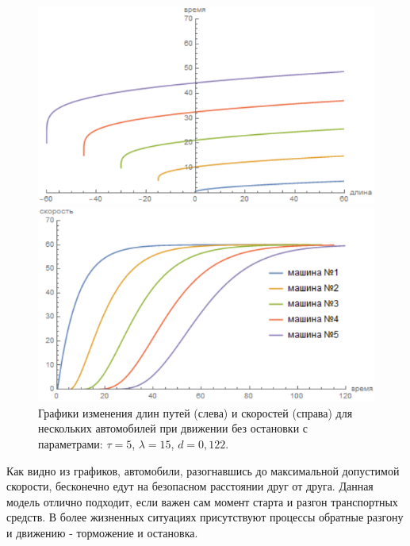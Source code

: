 \documentclass[12pt, a4paper]{extarticle}
\numberwithin{equation}{section}
\begin{document}
\begin{figure}[h!]
	\begin{center}
		\begin{minipage}[h!]{0.48\linewidth}
			\includegraphics[width=1\linewidth,height=0.2\textheight]
			{Images/distance_without_stop_d=0,122_tau=5.png}
		\end{minipage}
		\hfill 
		\begin{minipage}[h!]{0.48\linewidth}
			\includegraphics[width=1\linewidth,height=0.2\textheight]
			{Images/speed_without_stop_d=0,122_tau=5.png}
		\end{minipage}	
		\caption{Графики изменения длин путей (слева) и скоростей (справа) для нескольких автомобилей при движении без остановки с параметрами: $\tau=5$, $\lambda=15$, $d=0,122$.}
		\label{without_stop_d=0,122_tau=5}
	\end{center}
\end{figure}

Как видно из графиков, автомобили, разогнавшись до максимальной допустимой скорости, бесконечно едут на безопасном расстоянии друг от друга. Данная модель отлично подходит, если важен сам момент старта и разгон транспортных средств. В более жизненных ситуациях присутствуют процессы обратные разгону и движению - торможение и остановка. 
\end{document}
